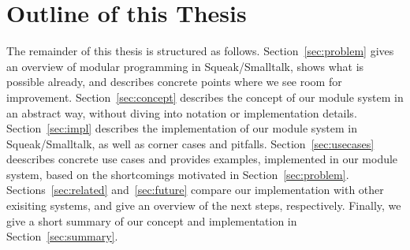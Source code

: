 \section{Outline of this Thesis}
The remainder of this thesis is structured as follows. Section~\ref{sec:problem} gives an overview of modular programming in Squeak/Smalltalk, shows what is possible already, and describes concrete points where we see room for improvement. Section~\ref{sec:concept} describes the concept of our module system in an abstract way, without diving into notation or implementation details. Section~\ref{sec:impl} describes the implementation of our module system in Squeak/Smalltalk, as well as corner cases and pitfalls. Section~\ref{sec:usecases} deescribes concrete use cases and provides examples, implemented in our module system, based on the shortcomings motivated in Section~\ref{sec:problem}. Sections~\ref{sec:related} and~\ref{sec:future} compare our implementation with other exisiting systems, and give an overview of the next steps, respectively. Finally, we give a short summary of our concept and implementation in Section~\ref{sec:summary}.
